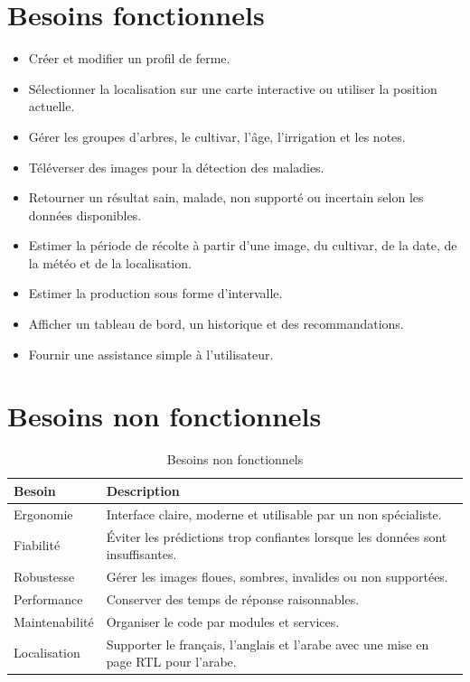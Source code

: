 \documentclass[12pt,a4paper]{report}
\begin{document}
\section{Besoins fonctionnels}
\begin{itemize}
    \item Créer et modifier un profil de ferme.
    \item Sélectionner la localisation sur une carte interactive ou utiliser la position actuelle.
    \item Gérer les groupes d'arbres, le cultivar, l'âge, l'irrigation et les notes.
    \item Téléverser des images pour la détection des maladies.
    \item Retourner un résultat sain, malade, non supporté ou incertain selon les données disponibles.
    \item Estimer la période de récolte à partir d'une image, du cultivar, de la date, de la météo et de la localisation.
    \item Estimer la production sous forme d'intervalle.
    \item Afficher un tableau de bord, un historique et des recommandations.
    \item Fournir une assistance simple à l'utilisateur.
\end{itemize}

\section{Besoins non fonctionnels}
\begin{table}[H]
\centering
\caption{Besoins non fonctionnels}
\label{tab:bnf}
\begin{tabular}{|p{4cm}|p{10cm}|}
\hline
\textbf{Besoin} & \textbf{Description} \\
\hline
Ergonomie & Interface claire, moderne et utilisable par un non spécialiste. \\
\hline
Fiabilité & Éviter les prédictions trop confiantes lorsque les données sont insuffisantes. \\
\hline
Robustesse & Gérer les images floues, sombres, invalides ou non supportées. \\
\hline
Performance & Conserver des temps de réponse raisonnables. \\
\hline
Maintenabilité & Organiser le code par modules et services. \\
\hline
Localisation & Supporter le français, l'anglais et l'arabe avec une mise en page RTL pour l'arabe. \\
\hline
\end{tabular}
\end{table}
\end{document}
